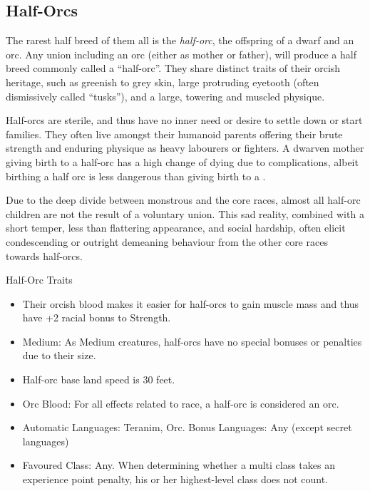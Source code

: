 \subsection{Half-Orcs}
\label{sec:Half-Orcs}

The rarest half breed of them all is the \emph{half-orc}, the offspring of a
dwarf and an orc. Any union including an orc (either as mother or father),
will produce a half breed commonly called a ``half-orc''. They share distinct
traits of their orcish heritage, such as greenish to grey skin, large
protruding eyetooth (often dismissively called ``tusks''), and a large,
towering and muscled physique.

Half-orcs are sterile, and thus have no inner need or desire to settle down or
start families. They often live amongst their humanoid parents offering their
brute strength and enduring physique as heavy labourers or fighters. A dwarven
mother giving birth to a half-orc has a high change of dying due to
complications, albeit birthing a half orc is less dangerous than giving birth
to a .

Due to the deep divide between monstrous and the core races, almost all
half-orc children are not the result of a voluntary union. This sad reality,
combined with a short temper, less than flattering appearance, and social
hardship, often elicit condescending or outright demeaning behaviour from the
other core races towards half-orcs.

\begin{35e}{Half-Orc Traits}
  \begin{itemize}[noitemsep]
    \item Their orcish blood makes it easier for half-orcs to gain muscle mass
      and thus have +2 racial bonus to Strength.
    \item Medium: As Medium creatures, half-orcs have no special bonuses or
      penalties due to their size.
    \item Half-orc base land speed is 30 feet.
    \item Orc Blood: For all effects related to race, a half-orc is considered
    an orc.
    \item Automatic Languages: Teranim, Orc. Bonus Languages: Any (except secret
      languages)
    \item Favoured Class: Any. When determining whether a multi class takes an
    experience point penalty, his or her highest-level class does not count.
  \end{itemize}
\end{35e}
